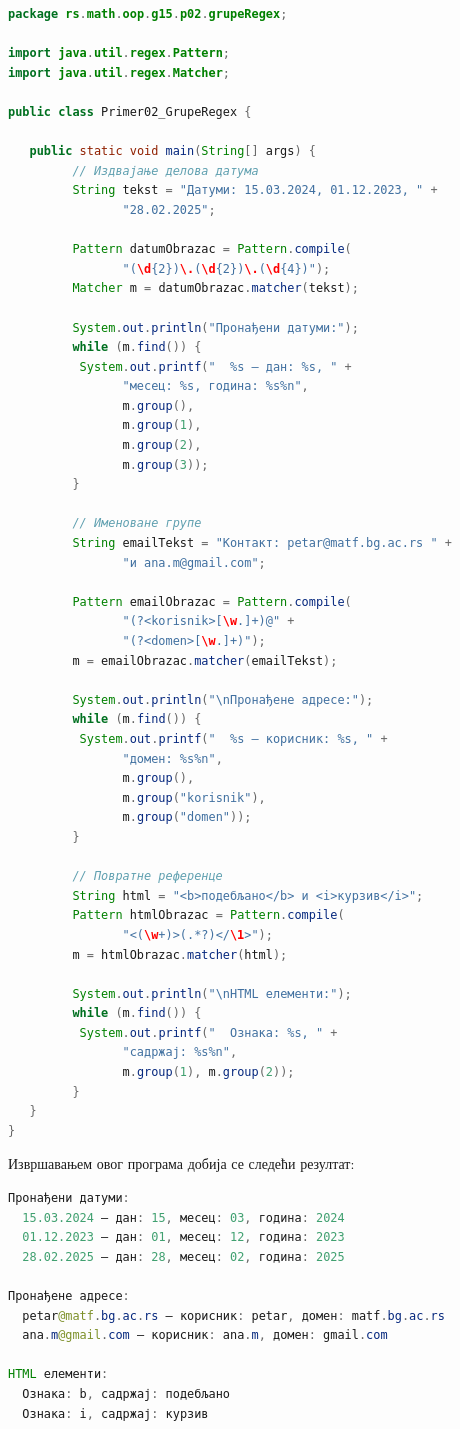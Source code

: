 \begin{lstlisting}[language=Java]
package rs.math.oop.g15.p02.grupeRegex;
 
import java.util.regex.Pattern;
import java.util.regex.Matcher;
 
public class Primer02_GrupeRegex {
 
   public static void main(String[] args) {
         // Издвајање делова датума
         String tekst = "Датуми: 15.03.2024, 01.12.2023, " +
                "28.02.2025";
 
         Pattern datumObrazac = Pattern.compile(
                "(\d{2})\.(\d{2})\.(\d{4})");
         Matcher m = datumObrazac.matcher(tekst);
 
         System.out.println("Пронађени датуми:");
         while (m.find()) {
          System.out.printf("  %s – дан: %s, " +
                "месец: %s, година: %s%n",
                m.group(),
                m.group(1),
                m.group(2),
                m.group(3));
         }
 
         // Именоване групе
         String emailTekst = "Контакт: petar@matf.bg.ac.rs " +
                "и ana.m@gmail.com";
 
         Pattern emailObrazac = Pattern.compile(
                "(?<korisnik>[\w.]+)@" +
                "(?<domen>[\w.]+)");
         m = emailObrazac.matcher(emailTekst);
 
         System.out.println("\nПронађене адресе:");
         while (m.find()) {
          System.out.printf("  %s – корисник: %s, " +
                "домен: %s%n",
                m.group(),
                m.group("korisnik"),
                m.group("domen"));
         }
 
         // Повратне референце
         String html = "<b>подебљано</b> и <i>курзив</i>";
         Pattern htmlObrazac = Pattern.compile(
                "<(\w+)>(.*?)</\1>");
         m = htmlObrazac.matcher(html);
 
         System.out.println("\nHTML елементи:");
         while (m.find()) {
          System.out.printf("  Ознака: %s, " +
                "садржај: %s%n",
                m.group(1), m.group(2));
         }
   }
}
\end{lstlisting}


Извршавањем овог програма добија се следећи резултат:


\begin{lstlisting}[language=Java]
Пронађени датуми:
  15.03.2024 – дан: 15, месец: 03, година: 2024
  01.12.2023 – дан: 01, месец: 12, година: 2023
  28.02.2025 – дан: 28, месец: 02, година: 2025
 
Пронађене адресе:
  petar@matf.bg.ac.rs – корисник: petar, домен: matf.bg.ac.rs
  ana.m@gmail.com – корисник: ana.m, домен: gmail.com
 
HTML елементи:
  Ознака: b, садржај: подебљано
  Ознака: i, садржај: курзив
\end{lstlisting}


